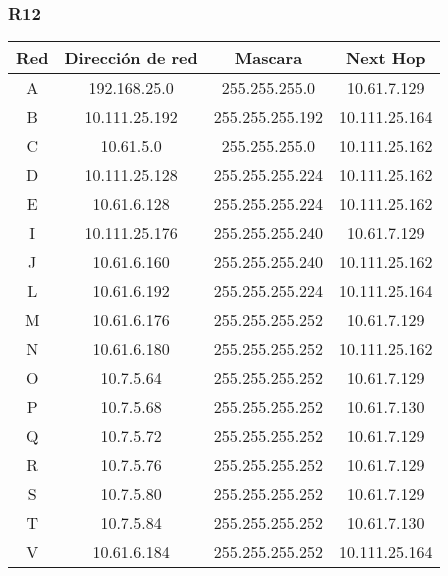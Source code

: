 \subsubsection{R12}
\begin{table}[!htbp]
\centering
  \begin{tabular}{|c|c|c|c|}
    \hline
	Red & Dirección de red & Mascara & Next Hop\\ \hline
	A & 192.168.25.0 & 255.255.255.0 & 10.61.7.129 \\ \hline
	B & 10.111.25.192 & 255.255.255.192 & 10.111.25.164 \\ \hline
	C & 10.61.5.0 & 255.255.255.0 & 10.111.25.162 \\ \hline
	D & 10.111.25.128 & 255.255.255.224 & 10.111.25.162 \\ \hline
	E & 10.61.6.128 & 255.255.255.224 & 10.111.25.162 \\ \hline
	I & 10.111.25.176 & 255.255.255.240 & 10.61.7.129 \\ \hline
	J & 10.61.6.160 & 255.255.255.240 & 10.111.25.162 \\ \hline
	L & 10.61.6.192 & 255.255.255.224 & 10.111.25.164 \\ \hline
	M & 10.61.6.176 & 255.255.255.252 & 10.61.7.129 \\ \hline
	N & 10.61.6.180 & 255.255.255.252 & 10.111.25.162 \\ \hline
	O & 10.7.5.64 & 255.255.255.252 & 10.61.7.129 \\ \hline
	P & 10.7.5.68 & 255.255.255.252 & 10.61.7.130 \\ \hline
	Q & 10.7.5.72 & 255.255.255.252 & 10.61.7.129 \\ \hline
	R & 10.7.5.76 & 255.255.255.252 & 10.61.7.129 \\ \hline
	S & 10.7.5.80 & 255.255.255.252 & 10.61.7.129 \\ \hline
	T & 10.7.5.84 & 255.255.255.252 & 10.61.7.130 \\ \hline
	V & 10.61.6.184 & 255.255.255.252 & 10.111.25.164 \\
    \hline
  \end{tabular}
\end{table}

\newpage
